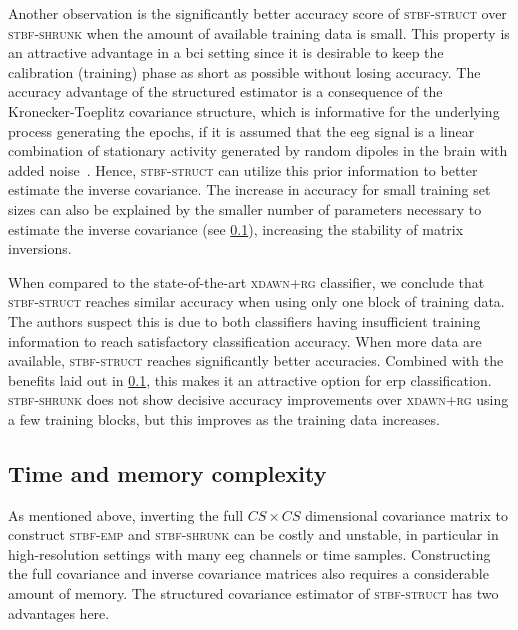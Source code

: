 	Another observation is the significantly better accuracy score of
	\textsc{stbf-struct} over \textsc{stbf-shrunk} when the amount of available training data is small.
	This property is an attractive advantage in a \ac{bci} setting since it is desirable to keep the calibration (training) phase as short as possible without losing accuracy.
	The accuracy advantage of the structured estimator is a consequence of the
	Kronecker-Toeplitz covariance structure, which is informative for the
	underlying process generating the epochs, if it is assumed that the \ac{eeg} signal
	is a linear combination of stationary activity generated by random dipoles in
	the brain with added noise~\cite{Munck1992, DeMunck2002, GonzalezNavarro2017}.
	Hence, \textsc{stbf-struct} can utilize this prior information to better estimate the inverse
	covariance.
	The increase in accuracy for small training set sizes can also be explained by the smaller number of parameters necessary to estimate the inverse covariance (see \cref{sec:parameters_complexity}), increasing the stability of matrix inversions.

	When compared to the state-of-the-art \textsc{xdawn+rg} classifier, we conclude
	that \textsc{stbf-struct} reaches similar accuracy when using only one block of
	training data.
	The authors suspect this is due to both
	classifiers having insufficient training information to reach
	satisfactory classification accuracy.
	When more data are available, \textsc{stbf-struct} reaches significantly better accuracies.
	Combined with the benefits laid out in \cref{sec:parameters_complexity}, this
  makes it an attractive option for \ac{erp} classification.
	\textsc{stbf-shrunk} does not show decisive accuracy improvements over
	\textsc{xdawn+rg} using a few training blocks, but this improves as the training data increases.

	\subsection{Time and memory complexity}
	\label{sec:parameters_complexity}
	As mentioned above, inverting the full $CS \times CS$ dimensional covariance
	matrix to construct \textsc{stbf-emp} and \textsc{stbf-shrunk} can be costly
	and unstable, in particular in high-resolution settings with many \ac{eeg} channels or time samples.
	Constructing the full covariance and inverse covariance matrices also requires a considerable amount of memory.
	The structured covariance estimator of \textsc{stbf-struct} has two advantages here.

